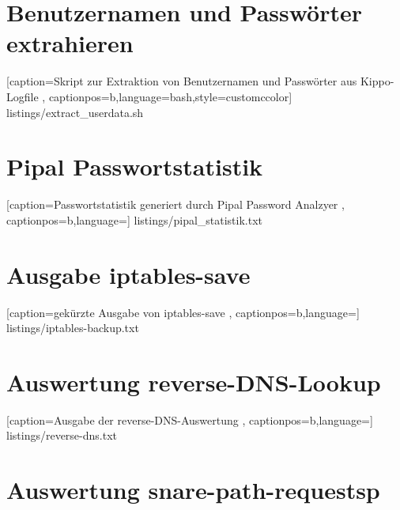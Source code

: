 \newpage

\section*{Benutzernamen und Passwörter extrahieren}
\label{app:Benutzernamen und Passwörter extrahieren}


    [caption={Skript zur Extraktion von Benutzernamen und Passwörter aus Kippo-Logfile}
       \label{lst:mitm_onmsg},
       captionpos=b,language=bash,style=customccolor]
 {listings/extract_userdata.sh}
 
 
\newpage
 
\section*{Pipal Passwortstatistik}
\label{app:Pipal Passwortstatistik}


    [caption={Passwortstatistik generiert durch Pipal Password Analzyer}
       \label{lst:mitm_onmsg},
       captionpos=b,language={}]
 {listings/pipal_statistik.txt}
 
 
\newpage 
 
\section*{Ausgabe iptables-save}
\label{app:Ausgabe iptables-save}


    [caption={gekürzte Ausgabe von iptables-save}
       \label{lst:mitm_onmsg},
       captionpos=b,language={}]
 {listings/iptables-backup.txt}
 

\newpage 
 
\section*{Auswertung reverse-DNS-Lookup}
\label{app:Auswertung reverse-DNS-Lookup}


    [caption={Ausgabe der reverse-DNS-Auswertung}
       \label{lst:reverse_dns},
       captionpos=b,language={}]
 {listings/reverse-dns.txt}
 
\newpage 
 
\section*{Auswertung snare-path-requestsp}
\label{app:Auswertung snare-path-requests}

